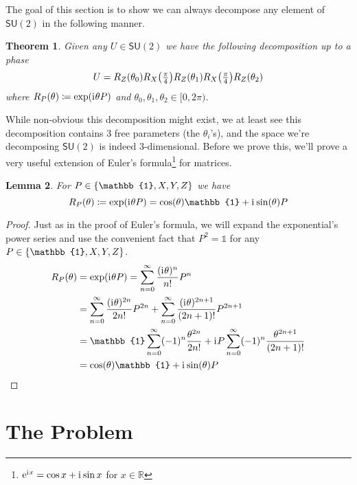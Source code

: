 \documentclass[12pt,dvipsnames]{article}
\newcommand{\SU}[1]{\mathsf{SU} (#1)}
\newcommand{\R}{\mathbb{R}}
\newcommand{\1}{\mathbb{1}}
\newcommand{\iu}{\mathrm{i}\mkern1mu}
\newcommand{\e}{\mathrm{e}}
\newcommand{\defeq}{\coloneqq}
\theoremstyle{plain}
\newtheorem{theorem}{Theorem}
\newtheorem{lem}[theorem]{Lemma}
\begin{document}
The goal of this section is to show we can always decompose any element of $\SU{2}$ in the following manner.
\begin{theorem}
    Given any $U\in\SU{2}$ we have the following decomposition up to a phase
    \begin{equation*}
        U = R_Z(\theta_0)R_X\qty(\tfrac{\pi}{4})R_Z(\theta_1)R_X\qty(\tfrac{\pi}{4})R_Z(\theta_2)
    \end{equation*}
    where $R_P(\theta) \defeq \exp(\iu \theta P)$ and $\theta_0, \theta_1, \theta_2\in[0, 2\pi)$.
\end{theorem}
While non-obvious this decomposition might exist, we at least see this decomposition contains 3 free parameters (the $\theta_i$'s), and the space we're decomposing $\SU{2}$ is indeed 3-dimensional.
Before we prove this, we'll prove a very useful extension of Euler's formula\footnote{$\e^{\iu x} = \cos{x} + \iu\sin{x}$ for $x\in\R$} for matrices.
\begin{lem}
    For $P\in \qty{\1, X, Y, Z}$ we have
    \begin{equation*}
        R_P(\theta) \defeq \exp(\iu\theta P) = \cos(\theta) \1 + \iu\sin(\theta) P
    \end{equation*}
\end{lem}
\begin{proof}
    Just as in the proof of Euler's formula, we will expand the exponential's power series and use the convenient fact that $P^2 = \1$ for any $P\in\qty{\1, X, Y, Z}$.
    \begin{align*}
        R_P(\theta) & = \exp(\iu\theta P) = \sum_{n = 0}^\infty\frac{(\iu \theta)^n}{n!}P^n                                                     \\
                    & = \sum_{n = 0}^\infty\frac{(\iu \theta)^{2n}}{2n!}P^{2n} + \sum_{n = 0}^\infty\frac{(\iu \theta)^{2n+1}}{(2n+1)!}P^{2n+1} \\
                    & = \1\sum_{n = 0}^\infty (-1)^n\frac{\theta^{2n}}{2n!} + \iu P\sum_{n = 0}^\infty (-1)^n\frac{\theta^{2n+1}}{(2n+1)!}      \\
                    & = \cos(\theta)\1 + \iu\sin(\theta)P
    \end{align*}
\end{proof}




\section{The Problem}
\end{document}
